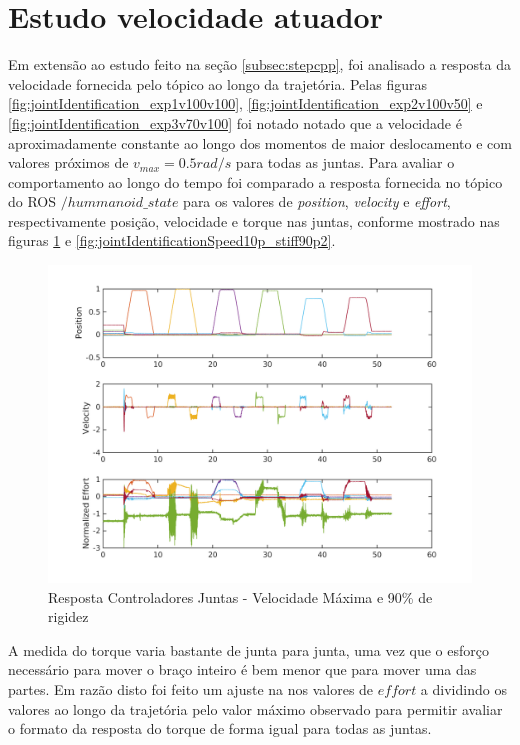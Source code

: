 
\section{Estudo velocidade atuador}

Em extensão ao estudo feito na seção \ref{subsec:stepcpp}, foi analisado a resposta da velocidade fornecida pelo tópico ao longo da trajetória. Pelas figuras \ref{fig:jointIdentification_exp1v100v100}, \ref{fig:jointIdentification_exp2v100v50} e \ref{fig:jointIdentification_exp3v70v100} foi notado notado que a velocidade é aproximadamente constante ao longo dos momentos de maior deslocamento e com valores próximos de $v_{max} = 0.5 rad/s$ para todas as juntas. Para avaliar o comportamento ao longo do tempo foi comparado a resposta fornecida no tópico do ROS $/hummanoid\_state$ para os valores de \textit{position}, \textit{velocity} e \textit{effort}, respectivamente posição, velocidade e torque nas juntas, conforme mostrado nas figuras \ref{fig:jointIdentificationFullSpeed_stiff90p} e \ref{fig:jointIdentificationSpeed10p_stiff90p2}.

\begin{figure}[H]
    \centering
    \includegraphics[width = \linewidth]{tex/figs/jointIdentificationFullSpeed_stiff90p.png}
    \caption{Resposta Controladores Juntas - Velocidade Máxima e 90\% de rigidez}
    \label{fig:jointIdentificationFullSpeed_stiff90p}
\end{figure}

A medida do torque varia bastante de junta para junta, uma vez que o esforço necessário para mover o braço inteiro é bem menor que para mover uma das partes. Em razão disto foi feito um ajuste na nos valores de $effort$ a dividindo os valores ao longo da trajetória pelo valor máximo observado para permitir avaliar o formato da resposta do torque de forma igual para todas as juntas.

